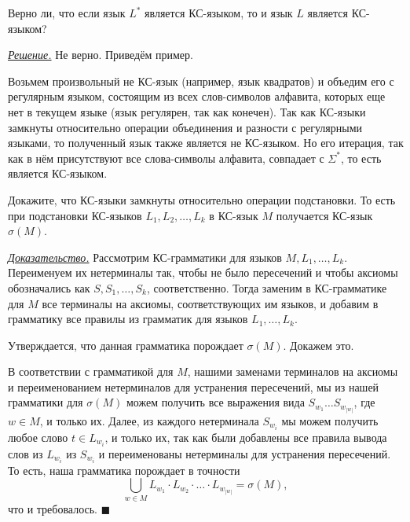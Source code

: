 \documentclass[10pt]{article}
\newcounter{pr} \setcounter{pr}{0}
\newenvironment{pruf}
  {\par
  {\itshape \underline{Доказательство.}}}
  {\hfill$\blacksquare$}
\newenvironment{sol}
  {\par
   {\itshape \underline{Решение.}}}
  {}
\begin{document}
  \begin{pr}
    Верно ли, что если  язык $L^*$ является КС-языком, то и язык $L$ является
    КС-языком?
    \begin{sol}
      Не верно. Приведём пример.

      Возьмем произвольный не КС-язык (например, язык квадратов) и объедим его с
      регулярным языком, состоящим из всех слов-символов алфавита, которых еще
      нет в текущем языке (язык регулярен, так как конечен). Так как КС-языки
      замкнуты относительно операции объединения и разности с регулярными
      языками, то полученный язык также является не КС-языком. Но его итерация,
      так как в нём присутствуют все слова-символы алфавита, совпадает с
      $\Sigma^*$, то есть является КС-языком.
    \end{sol}
  \end{pr}
  \begin{pr}
    Докажите, что КС-языки замкнуты относительно операции подстановки. То есть
    при подстановки КС-языков $L_1, L_2, \ldots, L_k$ в КС-язык $M$ получается
    КС-язык $\sigma(M)$.
    \begin{pruf}
      Рассмотрим КС-грамматики для языков $M, L_1, \ldots, L_k$. Переименуем их
      нетерминалы так, чтобы не было пересечений и чтобы аксиомы обозначались
      как $S, S_1, \ldots, S_k$, соответственно. Тогда заменим в КС-грамматике
      для $M$ все терминалы на аксиомы, соответствующих им языков, и добавим в
      грамматику все правилы из грамматик для языков $L_1, \ldots, L_k$.

      Утверждается, что данная грамматика порождает $\sigma(M)$. Докажем это.

      В соответствии с грамматикой для $M$, нашими заменами терминалов на
      аксиомы и переименованием нетерминалов для устранения пересечений, мы из
      нашей грамматики для $\sigma(M)$ можем получить все выражения вида
      $S_{w_1} \ldots S_{w_{|w|}}$, где $w \in M$, и только их. Далее, из
      каждого нетерминала $S_{w_i}$ мы можем получить любое слово $t \in
      L_{w_i}$, и только их, так как были добавлены все правила вывода слов из
      $L_{w_i}$ из $S_{w_i}$ и переименованы нетерминалы для устранения
      пересечений. То есть, наша грамматика порождает в точности
      \[
        \bigcup \limits_{w \in M}
          L_{w_1} \cdot L_{w_2} \cdot \ldots \cdot L_{w_{|w|}}
        = \sigma(M),
      \]
      что и требовалось.
    \end{pruf}
  \end{pr}
\end{document}
